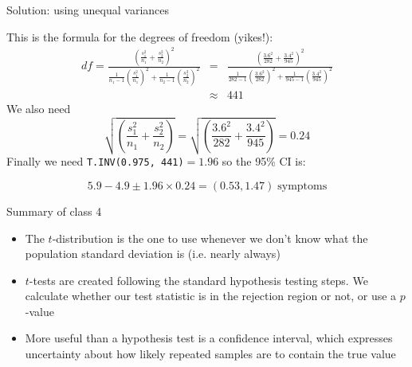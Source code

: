 \documentclass[12pt,xcolor=dvipsnames,handout,mathserif,aspectratio=169]{beamer}
\begin{document}
\begin{frame}{Solution: using unequal variances}

This is the formula for the degrees of freedom (yikes!):
\begin{eqnarray*}
df = \frac{ \left( \frac{s_1^2}{n_1} + \frac{s_2^2}{n_2} \right)^2 }{ \frac{1}{n_1-1} \left( \frac{s_1^2}{n_1} \right)^2 + \frac{1}{n_2-1} \left( \frac{s_2^2}{n_2} \right)^2 } &=& \frac{ \left( \frac{3.6^2}{282} + \frac{3.4^2}{945} \right)^2 }{ \frac{1}{282-1} \left( \frac{3.6^2}{282} \right)^2 + \frac{1}{945-1} \left( \frac{3.4^2}{945} \right)^2 } \\
&\approx& 441 
\end{eqnarray*}
We also need 
$$\sqrt{ \left( \frac{s_1^2}{n_1}+\frac{s_2^2}{n_2} \right) } = \sqrt{ \left( \frac{3.6^2}{282}+\frac{3.4^2}{945} \right) } = 0.24$$
Finally we need \texttt{T.INV(0.975, 441)}$=1.96$ so the 95\% CI is:
\begin{block}{}
$$5.9-4.9 \pm 1.96 \times 0.24 = (0.53,1.47)\; \mbox{symptoms}$$
\end{block}
\end{frame}

\begin{frame}{Summary of class 4}
\begin{itemize}
\item The $t$-distribution is the one to use whenever we don't know what the population standard deviation is (i.e. nearly always)
\item $t$-tests are created following the standard hypothesis testing steps. We calculate whether our test statistic is in the rejection region or not, or use a $p$-value
\item More useful than a hypothesis test is a confidence interval, which expresses uncertainty about how likely repeated samples are to contain the true value
\end{itemize}
\end{frame}
\end{document}
